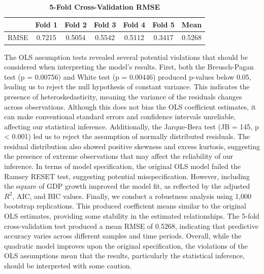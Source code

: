 \vspace{0.8em}
\begin{table}[H]
\centering
\caption{\textbf{5-Fold Cross-Validation RMSE}}
\label{tab:cv_rmse}
\renewcommand{\arraystretch}{1.3}
\setlength{\tabcolsep}{10pt}
\begin{tabular}{lcccccc}
\toprule
 & Fold 1 & Fold 2 & Fold 3 & Fold 4 & Fold 5 & Mean \\
\midrule
RMSE & 0.7215 & 0.5054 & 0.5542 & 0.5112 & 0.3417 & 0.5268 \\
\bottomrule
\end{tabular}
\end{table}
\vspace{0.8em}
The OLS assumption tests revealed several potential violations that should be considered when interpreting the model's results. First, both the Breusch-Pagan test (p = 0.00756) and White test (p = 0.00446) produced p-values below 0.05, leading us to reject the null hypothesis of constant variance. This indicates the presence of heteroskedasticity, meaning the variance of the residuals changes across observations. Although this does not bias the OLS coefficient estimates, it can make conventional standard errors and confidence intervals unreliable, affecting our statistical inference. Additionally, the Jarque-Bera test (JB = 145, p < 0.001) led us to reject the assumption of normally distributed residuals. The residual distribution also showed positive skewness and excess kurtosis, suggesting the presence of extreme observations that may affect the reliability of our inference. In terms of model specification, the original OLS model failed the Ramsey RESET test, suggesting potential misspecification. However, including the square of GDP growth improved the model fit, as reflected by the adjusted $R^2$, AIC, and BIC values. Finally, we conduct a robustness analysis using 1,000 bootstrap replications. This produced coefficient means similar to the original OLS estimates, providing some stability in the estimated relationships. The 5-fold cross-validation test produced a mean RMSE of 0.5268, indicating that predictive accuracy varies across different samples and time periods. Overall, while the quadratic model improves upon the original specification, the violations of the OLS assumptions mean that the results, particularly the statistical inference, should be interpreted with some caution.

